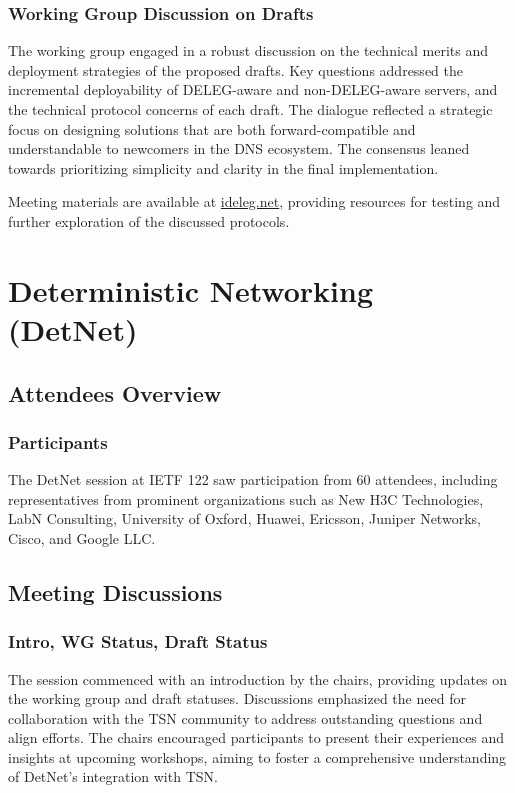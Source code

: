 \documentclass{article}
\begin{document}
\subsubsection{Working Group Discussion on Drafts}
The working group engaged in a robust discussion on the technical merits and deployment strategies of the proposed drafts. Key questions addressed the incremental deployability of DELEG-aware and non-DELEG-aware servers, and the technical protocol concerns of each draft. The dialogue reflected a strategic focus on designing solutions that are both forward-compatible and understandable to newcomers in the DNS ecosystem. The consensus leaned towards prioritizing simplicity and clarity in the final implementation.

Meeting materials are available at \href{https://ideleg.net/}{ideleg.net}, providing resources for testing and further exploration of the discussed protocols.



\newpage

\section{Deterministic Networking (DetNet)}

\subsection{Attendees Overview}
\subsubsection{Participants}
The DetNet session at IETF 122 saw participation from 60 attendees, including representatives from prominent organizations such as New H3C Technologies, LabN Consulting, University of Oxford, Huawei, Ericsson, Juniper Networks, Cisco, and Google LLC.

\subsection{Meeting Discussions}

\subsubsection{Intro, WG Status, Draft Status}
The session commenced with an introduction by the chairs, providing updates on the working group and draft statuses. Discussions emphasized the need for collaboration with the TSN community to address outstanding questions and align efforts. The chairs encouraged participants to present their experiences and insights at upcoming workshops, aiming to foster a comprehensive understanding of DetNet's integration with TSN.
\end{document}
